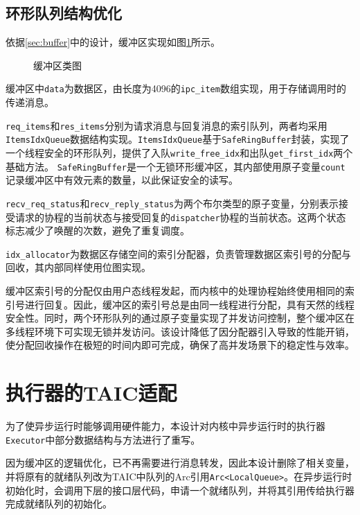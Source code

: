 \subsection{环形队列结构优化}

依据\ref{sec:buffer}中的设计，缓冲区实现如图\ref{缓冲区类图}所示。

\begin{figure}[htbp]
  \centering
  
  \caption{缓冲区类图}\label{缓冲区类图}
\end{figure}

缓冲区中\texttt{data}为数据区，由长度为4096的\texttt{ipc\_item}数组实现，用于存储调用时的传递消息。

\texttt{req\_items}和\texttt{res\_items}分别为请求消息与回复消息的索引队列，两者均采用\texttt{ItemsIdxQueue}数据结构实现。\texttt{ItemsIdxQueue}基于\texttt{SafeRingBuffer}封装，实现了一个线程安全的环形队列，提供了入队\texttt{write\_free\_idx}和出队\texttt{get\_first\_idx}两个基础方法。
\texttt{SafeRingBuffer}是一个无锁环形缓冲区，其内部使用原子变量\texttt{count}记录缓冲区中有效元素的数量，以此保证安全的读写。

\texttt{recv\_req\_status}和\texttt{recv\_reply\_status}为两个布尔类型的原子变量，分别表示接受请求的协程的当前状态与接受回复的\texttt{dispatcher}协程的当前状态。这两个状态标志减少了唤醒的次数，避免了重复调度。

\texttt{idx\_allocator}为数据区存储空间的索引分配器，负责管理数据区索引号的分配与回收，其内部同样使用位图实现。

缓冲区索引号的分配仅由用户态线程发起，而内核中的处理协程始终使用相同的索引号进行回复。因此，缓冲区的索引号总是由同一线程进行分配，具有天然的线程安全性。同时，两个环形队列的通过原子变量实现了并发访问控制，整个缓冲区在多线程环境下可实现无锁并发访问。该设计降低了因分配器引入导致的性能开销，使分配回收操作在极短的时间内即可完成，确保了高并发场景下的稳定性与效率。

\section{执行器的TAIC适配}

为了使异步运行时能够调用硬件能力，本设计对内核中异步运行时的执行器\texttt{Executor}中部分数据结构与方法进行了重写。

因为缓冲区的逻辑优化，已不再需要进行消息转发，因此本设计删除了相关变量，并将原有的就绪队列改为TAIC中队列的Arc引用\texttt{Arc<LocalQueue>}。在异步运行时初始化时，会调用下层的接口层代码，申请一个就绪队列，并将其引用传给执行器完成就绪队列的初始化。

